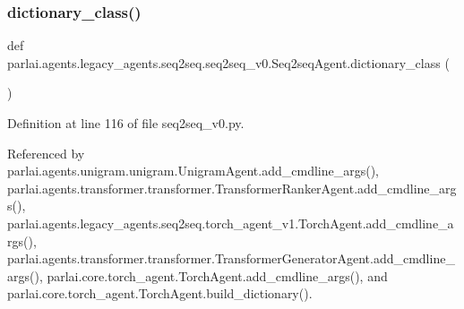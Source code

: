 \mbox{\label{classparlai_1_1agents_1_1legacy__agents_1_1seq2seq_1_1seq2seq__v0_1_1Seq2seqAgent_a05552a2714cd8d15d754a62258727c98}} 
\subsubsection{\texorpdfstring{dictionary\+\_\+class()}{dictionary\_class()}}
{\footnotesize\ttfamily def parlai.\+agents.\+legacy\+\_\+agents.\+seq2seq.\+seq2seq\+\_\+v0.\+Seq2seq\+Agent.\+dictionary\+\_\+class (\begin{DoxyParamCaption}{ }\end{DoxyParamCaption})\hspace{0.3cm}{\ttfamily [static]}}



Definition at line 116 of file seq2seq\+\_\+v0.\+py.



Referenced by parlai.\+agents.\+unigram.\+unigram.\+Unigram\+Agent.\+add\+\_\+cmdline\+\_\+args(), parlai.\+agents.\+transformer.\+transformer.\+Transformer\+Ranker\+Agent.\+add\+\_\+cmdline\+\_\+args(), parlai.\+agents.\+legacy\+\_\+agents.\+seq2seq.\+torch\+\_\+agent\+\_\+v1.\+Torch\+Agent.\+add\+\_\+cmdline\+\_\+args(), parlai.\+agents.\+transformer.\+transformer.\+Transformer\+Generator\+Agent.\+add\+\_\+cmdline\+\_\+args(), parlai.\+core.\+torch\+\_\+agent.\+Torch\+Agent.\+add\+\_\+cmdline\+\_\+args(), and parlai.\+core.\+torch\+\_\+agent.\+Torch\+Agent.\+build\+\_\+dictionary().

